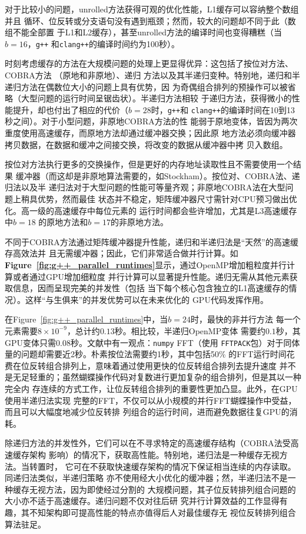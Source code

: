 \documentclass[10pt]{article}
\begin{document}
\begin{CJK*}{UTF8}{gbsn}
对于比较小的问题，unrolled方法获得可观的优化性能，L1缓存可以容纳整个数组并且
循环、位反转或分支语句没有遇到瓶颈；然而，较大的问题却不同于此（数组不能全部置
于L1和L2缓存），甚至unrolled方法的编译时间也变得糟糕（当$b=16$，{\tt g++}
和{\tt clang++}的编译时间约为100秒）。

时刻考虑缓存的方法在大规模问题的处理上更显得优异：这包括了按位对方法、COBRA方法
（原地和非原地）、递归
方法以及其半递归变种。特别地，递归和半递归方法在偶数位大小的问题上具有优势，因
为奇偶组合排列的预操作可以被省略（大型问题的运行时间呈锯齿状）。半递归方法相较
于递归方法，获得微小的性能提升，却也付出了相应的代价（$b=28$时，{\tt g++}和
{\tt clang++}的编译时间在10到13秒之间）。对于小型问题，非原地COBRA方法的性
能弱于原地变体，皆因为两次重度使用高速缓存，而原地方法却通过缓冲器交换；因此原
地方法必须向缓冲器拷贝数据，在数据和缓冲之间接交换，将改变的数据从缓冲器中拷
贝入数组。

按位对方法执行更多的交换操作，但是更好的内存地址读取性且不需要使用一个结果
缓冲器（而这却是非原地算法需要的，如Stockham）。按位对、COBRA法、递归法以及半
递归法对于大型问题的性能可等量齐观；非原地COBRA法在大型问题上稍具优势，然而最佳
状态并不稳定，矩阵缓冲器尺寸需针对CPU预习做出优化。高一级的高速缓存中每位元素的
运行时间都会些许增加，尤其是L3高速缓存中$b=18$
的原地方法和$b=17$的非原地方法。

不同于COBRA方法通过矩阵缓冲器提升性能，递归和半递归法是“天然”的高速缓存高效法并
且无需缓冲器；因此，它们非常适合做并行计算。如{\bf Figure~\ref{fig:g++_parallel_runtimes}}显示，通过OpenMP增加粗粒度并行计算或者通过GPU增加细粒度
并行计算可以显著提升性能。递归无需从其他元素获取信息，因而呈现完美的并发性（包括
当下每个核心包含独立的L1高速缓存的情况）。这样“与生俱来”的并发优势可以在未来优化的
GPU代码发挥作用。

在Figure~\ref{fig:g++_parallel_runtimes}中，当$b=24$时，最快的非并行方法
每一个元素需要$8 \times{10}^{-9}$，总计约$0.13$秒。相比较，半递归OpenMP变体
需要约$0.1$秒，其GPU变体只需$0.08$秒。文献中有一观点：{\tt numpy} FFT（使用
{\tt FFTPACK}包）对于同体量的问题却需要近2秒。朴素按位法需要约1秒，其中包括50\%
的FFT运行时间花费在位反转组合排列上，意味着通过使用更快的位反转组合排列去提升速度
并不是无足轻重的；虽然蝴蝶操作代码对复数进行更加复杂的组合排列，但是其以一种完全内
存连续的方式工作，让位反转组合排列的重要性更加凸显。此外，在GPU使用半递归法实现
完整的FFT，不仅可以从小规模的并行FFT蝴蝶操作中受益，而且可以大幅度地减少位反转排
列组合的运行时间，进而避免数据往复GPU的消耗。

除递归方法的并发性外，它们可以在不寻求特定的高速缓存结构（COBRA法受高速缓存架构
影响）的情况下，获取高性能。特别地，递归法是一种缓存无视方法。当转置时\cite{prokop:cache}，
它可在不获取快速缓存架构的情况下保证相当连续的内存读取。同递归法类似，半递归策略
亦不使用经大小优化的缓冲器；然，半递归法不是一种缓存无视方法，因为即使经过分割的
大规模问题，其子位反转排列组合问题的大小亦不适于高速缓存。递归问题不仅对往后研
究并行计算效益的工作显得有趣，其不知架构即可提高性能的特点亦值得后人对最佳缓存无
视位反转排列组合算法驻足。




\end{CJK*}
\end{document}
